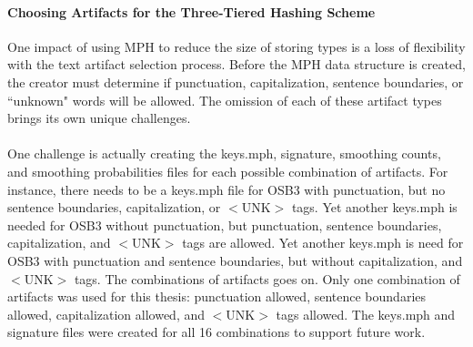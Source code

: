 		\paragraph{Choosing Artifacts for the Three-Tiered Hashing Scheme} One impact of using MPH to reduce the size of storing types is a loss of flexibility with the text artifact selection process.  Before the MPH data structure is created, the creator must determine if punctuation, capitalization, sentence boundaries, or ``unknown" words will be allowed.  The omission of each of these artifact types brings its own unique challenges. 
		\paragraph*{} One challenge is actually creating the keys.mph, signature, smoothing counts, and smoothing probabilities files for each possible combination of artifacts.  For instance, there needs to be a keys.mph file for OSB3 with punctuation, but no sentence boundaries, capitalization, or $<\text{UNK}>$ tags.  Yet another keys.mph is needed for OSB3 without punctuation, but punctuation, sentence boundaries, capitalization, and $<\text{UNK}>$ tags are allowed. Yet another keys.mph is need for OSB3 with punctuation and sentence boundaries, but without capitalization, and $<\text{UNK}>$ tags.  The combinations of artifacts goes on.  Only one combination of artifacts was used for this thesis: punctuation allowed, sentence boundaries allowed, capitalization allowed, and $<\text{UNK}>$ tags allowed.  The keys.mph and signature files were created for all 16 combinations to support future work.
